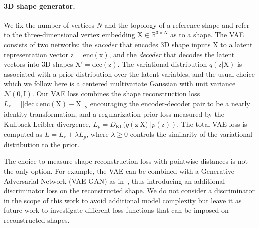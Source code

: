 \documentclass[10pt,twocolumn,letterpaper]{article}
\newcommand{\bb}[1]{\bm{\mathrm{#1}}}
\begin{document}
\paragraph{3D shape generator.}
We fix the number of vertices $N$ and the topology of a reference shape and refer to the three-dimensional vertex embedding $\bb{X}  \in \mathbb{R}^{3 \times N}$ as to a shape.
%
The VAE consists of two networks: the \emph{encoder} that encodes 3D shape inputs $\bb{X}$ to a latent representation vector $\bb{z}=\mathrm{enc}(\bb{x})$, and the \emph{decoder} that decodes the latent vectors into 3D shapes $\bb{X}'=\mathrm{dec}(\bb{z})$. The variational distribution $q(\bb{z}|\bb{X})$ is associated with a prior distribution over the latent variables, and the usual choice which we follow here is a centered multivariate Gaussian with unit variance $\mathcal{N}(\bb{0},\bb{I})$. Our VAE loss combines the shape reconstruction loss $L_r = ||\mathrm{dec}\circ \mathrm{enc} (\bb{X})-\bb{X}||_2$ encouraging the encoder-decoder pair to be a nearly identity transformation, and a regularization prior loss measured by the Kullback-Leibler divergence, $L_p=D_\mathrm{KL}(q(\bb{z}|\bb{X})||p(\bb{z}))$. The total VAE loss is computed as $L=L_r + \lambda L_p$, where $\lambda \geq 0$ controls the similarity of the variational distribution to the prior.

The choice to measure shape reconstruction loss with pointwise distances is not the only option. For example, the VAE can be combined with a Generative Adversarial Network (VAE-GAN) as in~\cite{larsen16icml,wu16nips}, thus introducing an additional discriminator loss on the reconstructed shape. We do not consider a discriminator in the scope of this work to avoid additional model complexity but leave it as future work to investigate different loss functions that can be imposed on reconstructed shapes.
\end{document}
